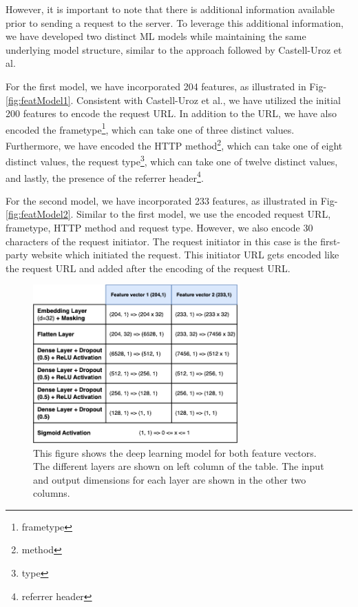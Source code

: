 However, it is important to note that there is additional information available prior to sending a request to the server.
To leverage this additional information, we have developed two distinct ML models while maintaining
the same underlying model structure, similar to the approach followed by Castell-Uroz et al.

For the first model, we have incorporated 204 features, as illustrated in Fig-\ref{fig:featModel1}. Consistent with Castell-Uroz et al.,
we have utilized the initial 200 features to encode the request URL. In addition to the URL, we have also encoded the frametype\footnote{frametype},
which can take one of three distinct values. Furthermore, we have encoded the HTTP method\footnote{method}, which can take
one of eight distinct values, the request type\footnote{type}, which can take one of twelve distinct values,
and lastly, the presence of the referrer header\footnote{referrer header}.

For the second model, we have incorporated 233 features, as illustrated in Fig-\ref{fig:featModel2}. Similar to the first model,
we use the encoded request URL, frametype, HTTP method and request type. However, we also encode
30 characters of the request initiator. The request initiator in this case is the first-party website which initiated the request. This 
initiator URL gets encoded like the request URL and added after the encoding of the request URL.

\begin{figure}[ht!]
  \begin{center}
    \includegraphics[width=0.7\textwidth]{images/DL.png}
  \end{center}
  \caption{This figure shows the deep learning model for both feature vectors. The different layers are shown on left column of the table. The input
  and output dimensions for each layer are shown in the other two columns.}
  \label{fig:modelStructure}
\end{figure}

